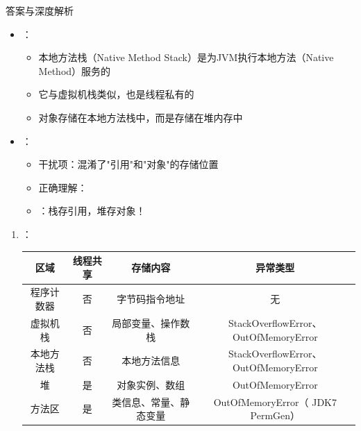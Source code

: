 \documentclass[12pt, a4paper]{ctexart}
\begin{document}
\begin{enumerate}[label=\textbf{\arabic*.}]
\begin{bluebox}{答案与深度解析}
\begin{itemize}[leftmargin=*, nosep]
			      \item {}：
			            \begin{itemize}
				            \item 本地方法栈（Native Method Stack）是为JVM执行本地方法（Native Method）服务的
				            \item 它与虚拟机栈类似，也是线程私有的
				            \item 对象存储在本地方法栈中，而是存储在堆内存中
			            \end{itemize}

			      \item {}：
			            \begin{itemize}
				            \item 干扰项：混淆了"引用"和"对象"的存储位置
				            \item 正确理解：
				            \item {}：栈存引用，堆存对象！
			            \end{itemize}
		      \end{itemize}

		      \begin{enumerate}[leftmargin=*, nosep]
			      \item {}：
			            \begin{tabular}{|c|c|c|c|}
				            \hline
				            \textbf{区域} & \textbf{线程共享} & \textbf{存储内容} & \textbf{异常类型}                       \\
				            \hline
				            程序计数器       & 否             & 字节码指令地址       & 无                                   \\
				            \hline
				            虚拟机栈        & 否             & 局部变量、操作数栈     & StackOverflowError、OutOfMemoryError \\
				            \hline
				            本地方法栈       & 否             & 本地方法信息        & StackOverflowError、OutOfMemoryError \\
				            \hline
				            堆           & 是             & 对象实例、数组       & OutOfMemoryError                    \\
				            \hline
				            方法区         & 是             & 类信息、常量、静态变量   & OutOfMemoryError（ JDK7 PermGen）     \\
				            \hline
			            \end{tabular}


\end{enumerate}
\end{bluebox}
\end{enumerate}
\end{document}

